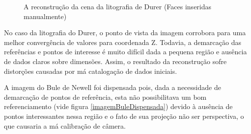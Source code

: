 			\begin{figure}[!htb]
				\centering
				\quad
				\quad
				\caption{A reconstrução da cena da litografia de Durer (Faces inseridas manualmente)}
				\label{resultadosDurerTriplo}
			\end{figure}
			
			No caso da litografia do Durer, o ponto de vista da imagem corrobora para uma melhor convergência de valores para coordenada Z. Todavia, a demarcação das referências e pontos de interesse é muito difícil dada a pequena região e ausência de dados claros sobre dimensões. Assim, o resultado da reconstrução sofre distorções causadas por má catalogação de dados iniciais.
			
			A imagem do Bule de Newell foi dispensada pois, dada a necessidade de demarcação de pontos de referência, esta não possibilitava um bom referenciamento (vide figura \ref{imagemBuleDispensada}) devido à ausência de pontos interessantes nessa região e o fato de sua projeção não ser perspectiva, o que causaria a má calibração de câmera.
			
